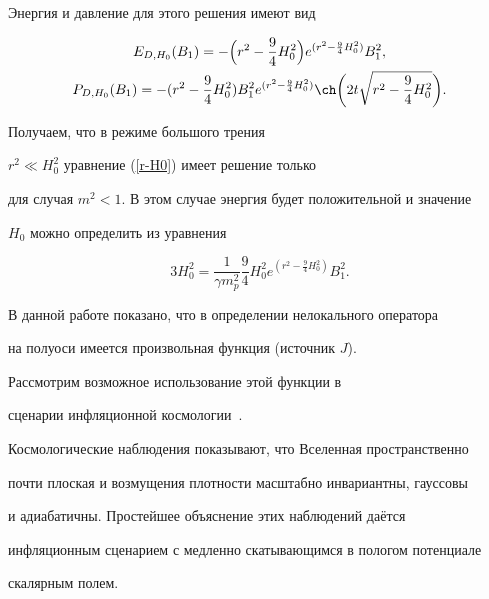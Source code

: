 Энергия и давление для этого решения имеют вид

\begin{gather*}

E_{D,H_0}(B_1)=-\Bigl(r^2-\frac94H_0^2\Bigr) e^{(r^2-\frac94H_0^2)}B^2_1,\\

P_{D,H_0}(B_1)=

-(r^2-\frac94H_0^2)B^2_{1}e^{(r^2-\frac94H_0^2)}\ch 

\biggl(2t\sqrt{r^2-\frac94H_0^2}\biggr).

\end{gather*}

Получаем, что в режиме большого трения

$r^2\ll H_0^2$ уравнение (\ref{r-H0}) имеет решение только

для случая $m^2<1$. В этом случае энергия будет положительной и значение

 $H_0$ можно определить из уравнения

\begin{equation*}

3H_0^2=\frac{1}{\gamma m_p^2}\frac94H_0^2 e^{(r^2-\frac94H_0^2)}B^2_1.

\end{equation*}



\smallskip



\hypertarget{razd:4}{}




В данной работе показано, что в определении нелокального оператора

на полуоси имеется произвольная функция (источник $J$).

Рассмотрим возможное использование этой функции в

сценарии инфляционной космологии~\cite{Linde}.



Космологические наблюдения показывают, что Вселенная пространственно

почти плоская и возмущения плотности масштабно инвариантны, гауссовы

и адиабатичны. Простейшее объяснение этих наблюдений даётся

инфляционным сценарием с медленно скатывающимся в пологом потенциале

скалярным полем.



